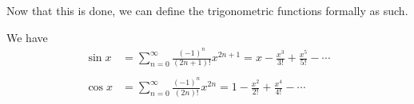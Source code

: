   Now that this is done, we can define the trigonometric functions formally as such. 

  \begin{definition}
    We have 
    \begin{align}
      \sin x&=\sum_{n=0}^{\infty}\frac{(-1)^n}{(2n+1)!}x^{2n+1}=x-\frac{x^3}{3!}+\frac{x^5}{5!}-\cdots
      \\\\
      \cos x&=\sum_{n=0}^{\infty}\frac{(-1)^n}{(2n)!}x^{2n}=1-\frac{x^2}{2!}+\frac{x^4}{4!}-\cdots
    \end{align}
  \end{definition}

